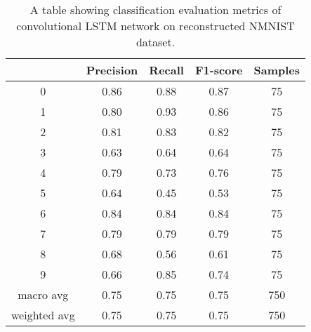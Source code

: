 \begin{table}[htb]
    \centering
    \begin{tabular}{|| c | c | c | c | c ||}
        \hline
             & Precision & Recall & F1-score & Samples \\
        \hline \hline
        0            & 0.86 & 0.88 & 0.87 & 75  \\
        \hline
        1            & 0.80 & 0.93 & 0.86 & 75  \\
        \hline
        2            & 0.81 & 0.83 & 0.82 & 75  \\
        \hline
        3            & 0.63 & 0.64 & 0.64 & 75  \\
        \hline
        4            & 0.79 & 0.73 & 0.76 & 75  \\
        \hline
        5            & 0.64 & 0.45 & 0.53 & 75  \\
        \hline
        6            & 0.84 & 0.84 & 0.84 & 75  \\
        \hline
        7            & 0.79 & 0.79 & 0.79 & 75  \\
        \hline
        8            & 0.68 & 0.56 & 0.61 & 75  \\
        \hline
        9            & 0.66 & 0.85 & 0.74 & 75  \\
        \hline
        macro avg    & 0.75 & 0.75 & 0.75 & 750 \\
        \hline
        weighted avg & 0.75 & 0.75 & 0.75 & 750 \\
        \hline
    \end{tabular}
    \caption{A table showing classification evaluation metrics of convolutional LSTM network on reconstructed NMNIST dataset.}
    \label{tab:conv_lstm_nmnist_recon_evaluation_metrics}
\end{table}

